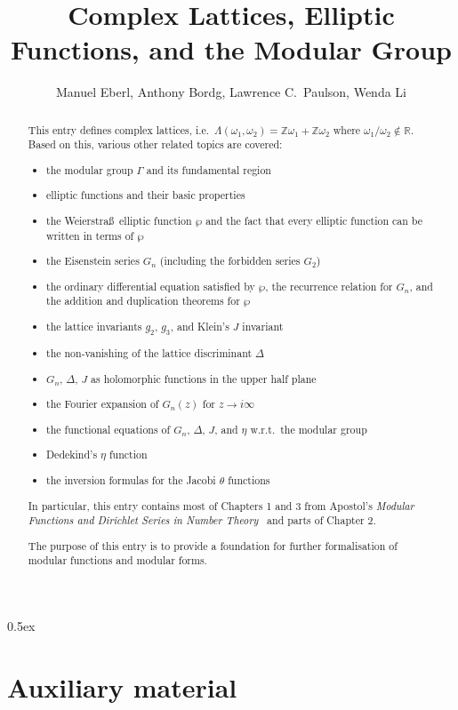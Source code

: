\documentclass[11pt,a4paper]{article}
\begin{document}
\title{Complex Lattices, Elliptic Functions, and the Modular Group}
\author{Manuel Eberl, Anthony Bordg, Lawrence C.\ Paulson, Wenda Li}
\maketitle

\begin{abstract}
This entry defines complex lattices, i.e.\ $\Lambda(\omega_1,\omega_2) = \mathbb{Z}\omega_1 + \mathbb{Z}\omega_2$ where $\omega_1/\omega_2\notin\mathbb{R}$.
Based on this, various other related topics are covered:
\begin{itemize}
\item the modular group $\Gamma$ and its fundamental region
\item elliptic functions and their basic properties
\item the Weierstra\ss\ elliptic function $\wp$ and the fact that every elliptic function
can be written in terms of $\wp$
\item the Eisenstein series $G_n$ (including the forbidden series $G_2$)
\item the ordinary differential equation satisfied by $\wp$, the recurrence relation for $G_n$,
 and the addition and duplication theorems for $\wp$
\item the lattice invariants $g_2$, $g_3$, and Klein's $J$ invariant
\item the non-vanishing of the lattice discriminant $\Delta$
\item $G_n$, $\Delta$, $J$ as holomorphic functions in the upper half plane
\item the Fourier expansion of $G_n(z)$ for $z\to i\infty$
\item the functional equations of $G_n$, $\Delta$, $J$, and $\eta$ w.r.t.\ the modular group
\item Dedekind's $\eta$ function
\item the inversion formulas for the Jacobi $\theta$ functions
\end{itemize}
In particular, this entry contains most of Chapters 1 and 3 from Apostol's
\emph{Modular Functions and Dirichlet Series in Number Theory}~\cite{apostol} and parts of Chapter 2.

The purpose of this entry is to provide a foundation for further formalisation of
modular functions and modular forms.
\end{abstract}

\newpage

\tableofcontents

\newpage
\parindent 0pt\parskip 0.5ex

\section{Auxiliary material}



\raggedright
\nocite{brent2020}
\nocite{borwein1987}



\end{document}
